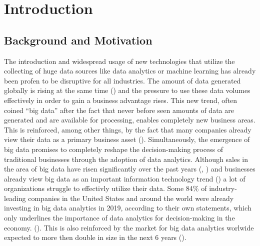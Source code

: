 \newpage\section{Introduction}

\subsection{Background and Motivation}


The introduction and widespread usage of new technologies that utilize the collecting of huge data sources like data analytics or machine learning has already been profen to be disruptive for all industries. The amount of data generated globally is rising at the same time (\cite{Seagate.2018}) and the pressure to use these data volumes effectively in order to gain a business advantage rises. This new trend, often coined \enquote{big data} after the fact that never before seen amounts of data are generated and are available for processing, enables completely new business areas. This is reinforced, among other things, by the fact that many companies already view their data as a primary business asset (\cite{Redman.2008}). Simultaneously, the emergence of big data promises to completely reshape the decision-making process of traditional businesses through the adoption of data analytics. Although sales in the area of big data have risen significantly over the past years (\cite{BISResearch.2018}, \cite{Bitkom.2018}) and businesses already view big data as an important information technology trend (\cite{Bitkom.2017}) a lot of organizations struggle to effectivly utilize their data. Some 84\% of industry-leading companies in the United States and around the world were already investing in big data analytics in 2019, according to their own statements, which only underlines the importance of data analytics for decision-making in the economy. (\cite{statista.2019}). This is also reinforced by the market for big data analytics worlwide expected to more then double in size in the next 6 years (\cite{statista.2022}).

